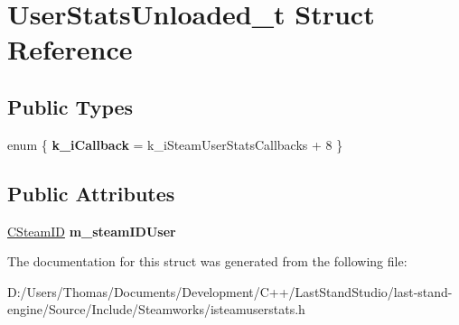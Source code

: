 \hypertarget{structUserStatsUnloaded__t}{}\section{User\+Stats\+Unloaded\+\_\+t Struct Reference}
\label{structUserStatsUnloaded__t}
\subsection*{Public Types}
\begin{DoxyCompactItemize}
\item 
\hypertarget{structUserStatsUnloaded__t_acb663c1ce230916a6073655e1a4fb6e8}{}enum \{ {\bfseries k\+\_\+i\+Callback} = k\+\_\+i\+Steam\+User\+Stats\+Callbacks + 8
 \}\label{structUserStatsUnloaded__t_acb663c1ce230916a6073655e1a4fb6e8}

\end{DoxyCompactItemize}
\subsection*{Public Attributes}
\begin{DoxyCompactItemize}
\item 
\hypertarget{structUserStatsUnloaded__t_ae88668ae8a53ea70d142b9ab1856350f}{}\hyperlink{classCSteamID}{C\+Steam\+I\+D} {\bfseries m\+\_\+steam\+I\+D\+User}\label{structUserStatsUnloaded__t_ae88668ae8a53ea70d142b9ab1856350f}

\end{DoxyCompactItemize}


The documentation for this struct was generated from the following file\+:\begin{DoxyCompactItemize}
\item 
D\+:/\+Users/\+Thomas/\+Documents/\+Development/\+C++/\+Last\+Stand\+Studio/last-\/stand-\/engine/\+Source/\+Include/\+Steamworks/isteamuserstats.\+h\end{DoxyCompactItemize}
